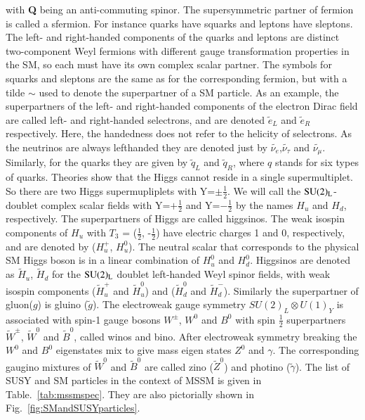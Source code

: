 with {\bf Q} being an anti-commuting spinor. The supersymmetric partner of fermion is called a sfermion. For instance quarks have squarks and leptons have  sleptons. The left- and right-handed components of the quarks and leptons are distinct two-component Weyl fermions with different gauge transformation properties in the SM, so each must have its own complex scalar partner. The symbols for  squarks and sleptons are the same as for the corresponding fermion, but with a tilde $\sim$ used to denote the superpartner of a SM particle. As an example, the superpartners of the left- and right-handed components of the electron Dirac field are called left- and right-handed selectrons, and are denoted $\tilde{e}_{L}$ and $\tilde{e}_{R}$ respectively. Here, the handedness does not refer to the helicity of selectrons. As the neutrinos are always lefthanded they are denoted just by $\tilde{\nu_{e}}$,$\tilde{\nu_{\tau}}$ and $\tilde{\nu_{\mu}}$. Similarly, for the quarks they are given by $\tilde{q}_{L}$ and $\tilde{q}_{R}$, where $q$ stands for six types of quarks. Theories show that the Higgs cannot reside in a single supermultiplet. So there are two Higgs supermupliplets with Y=$\pm \frac{1}{2}$. We will call the $\rm SU(2)_{L}$-doublet complex scalar fields with  Y=$+ \frac{1}{2}$ and Y=$- \frac{1}{2}$ by the names $H_{u}$ and $H_{d}$, respectively. The superpartners of Higgs are called higgsinos. The weak isospin components of $H_{u}$ with $T_{3}$ = ($\frac{1}{2}$, -$\frac{1}{2}$) have electric charges 1 and 0, respectively, and are denoted by ($H_{u}^{+}$, $H_{u}^{0}$). The neutral scalar that corresponds to the physical
SM Higgs boson is in a linear combination of $H_{u}^{0}$ and $H_{d}^{0}$. Higgsinos are denoted as $\tilde{H}_{u}$, $\tilde{H}_{d}$ for the $\rm SU(2)_{L}$ doublet left-handed Weyl spinor fields, with weak isospin components ($\tilde{H}_{u}^{+}$ and $\tilde{H}_{u}^{0}$) and ($\tilde{H}_{d}^{0}$ and $\tilde{H}_{d}^{-}$). Similarly the superpartner of gluon($g$) is gluino ($\tilde{g}$). The electroweak gauge symmetry $SU(2)_{L} \otimes U(1)_{Y}$ is associated with spin-1 gauge bosons $W^{\pm}$, $W^{0}$ and $B^{0}$ with spin $\frac{1}{2}$ superpartners $\tilde{W}^{\pm}$, $\tilde{W}^{0}$ and $\tilde{B}^{0}$, called winos and bino. After electroweak symmetry breaking the  $W^{0}$ and $B^{0}$ eigenstates mix to give mass eigen states $Z^{0}$ and $\gamma$. The corresponding gaugino mixtures of $\tilde{W}^{0}$ and $\tilde{B}^{0}$ are called zino ($\tilde{Z}^{0}$) and photino ($\tilde{\gamma}$). The list of SUSY and SM particles  in the context of MSSM is given in Table.~\ref{tab:mssmspec}. They are also pictorially shown 
in Fig.~\ref{fig:SMandSUSYparticles}.


